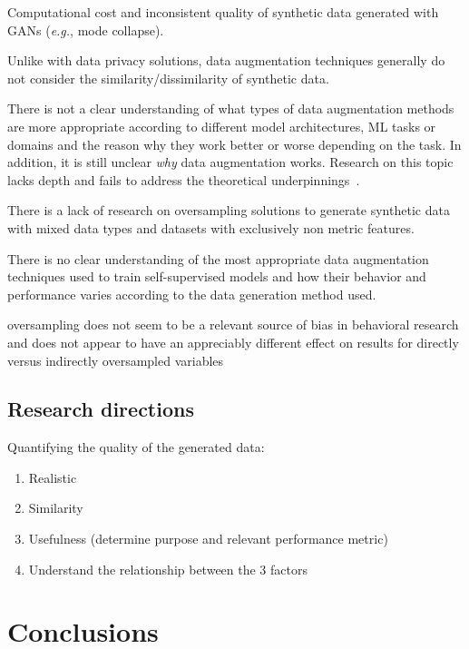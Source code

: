 \documentclass[parskip=full]{scrartcl}
\begin{document}
Computational cost and inconsistent quality of synthetic data generated with
GANs (\textit{e.g.}, mode collapse).

Unlike with data privacy solutions, data augmentation techniques generally do
not consider the similarity/dissimilarity of synthetic data.

There is not a clear understanding of what types of data augmentation methods
are more appropriate according to different model architectures, ML tasks or
domains and the reason why they work better or worse depending on the task. 
In addition, it is still unclear \textit{why} data augmentation works.
Research on this topic lacks depth and fails to address the theoretical
underpinnings~\cite{feng2021survey}.

There is a lack of research on oversampling solutions to generate synthetic
data with mixed data types and datasets with exclusively non metric features.




There is no clear understanding of the most appropriate data augmentation
techniques used to train self-supervised models and how their behavior and
performance varies according to the data generation method used.


oversampling does not seem to be a relevant source of bias in behavioral
research and does not appear to have an appreciably different effect on
results for directly versus indirectly oversampled
variables~\cite{hauner2014latent}


\subsection{Research directions}


Quantifying the quality of the generated data:

\begin{enumerate}
    \item Realistic
    \item Similarity
    \item Usefulness (determine purpose and relevant performance metric)
    \item Understand the relationship between the 3 factors
\end{enumerate}

\section{Conclusions}~\label{sec:conclusions}

\printbibliography
\end{document}
